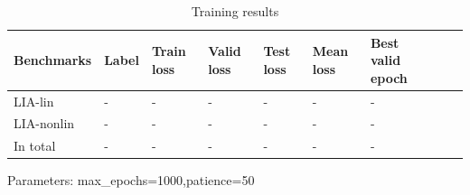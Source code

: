 \documentclass{article}
\begin{document}
\begin{table}\caption{Training results}
\begin{center}
\begin{tabular}{lp{1cm}p{1cm}p{1.5cm}p{1.5cm}p{1.5cm}p{1.5cm}p{1.5cm}p{1.5cm}}
\hline
Benchmarks  & Label & Train loss & Valid loss & Test loss & Mean loss & Best valid epoch  \\
\hline
LIA-lin       & - & - & - & - & - & - \\
LIA-nonlin    & - & - & - & - & - & - \\
In total      & - & - & - & - & - & - \\
\hline
\end{tabular}
\end{center}
\end{table}

Parameters: max\_epochs=1000,patience=50

%
%
%





\end{document}
